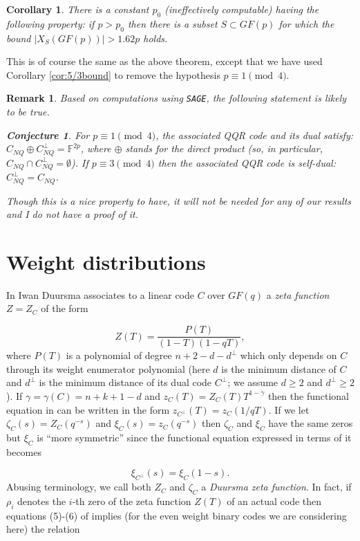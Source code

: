 \documentclass[submission%
]{dmtcs}
\newtheorem{remark}{Remark}
\newtheorem{conjecture}{Conjecture}
\newtheorem{corollary}{Corollary}
\def\fff{{\mathbb{F}}}
\def\sage{{\tt{SAGE}}}
\begin{document}
\begin{corollary}
\label{cor:main}
There is a constant $p_0$ (ineffectively computable) having the following
property: if $p>p_0$ then there is a 
subset $S\subset GF(p)$ for which the bound $|X_S(GF(p))| > 1.62p$
holds.
\end{corollary}

This is of course the same as the above theorem, except that
we have used Corollary \ref{cor:5/3bound} to remove
the hypothesis $p\equiv 1\pmod 4$.

\begin{remark}
Based on computations using \sage, the following statement is likely
to be true.

\begin{conjecture} 
\label{lemma:self-orth}
For $p\equiv 1 \pmod{4}$, the associated QQR code and its dual satisfy:
$C_{NQ} \oplus C_{NQ}^\perp = \fff^{2p}$, where $\oplus$ stands for the 
direct product (so, in particular, $C_{NQ} \cap C_{NQ}^\perp = \emptyset$).
If $p\equiv 3 \pmod 4$ then the associated QQR code is self-dual:
$C_{NQ}^\perp = C_{NQ}$.
\end{conjecture}

Though this is a nice property to have, it will not be needed for
any of our results and I do not have a proof of it.
\end{remark}

\section{Weight distributions}
\label{sec:duursma}

In \cite{D1} Iwan Duursma associates to a linear code $C$ 
over $GF(q)$ a {\it zeta function} $Z=Z_C$ of the form

\[
Z(T)=\frac{P(T)}{(1-T)(1-qT)},
\] 
where $P(T)$ is a polynomial of degree $n+2-d-d^\perp$
which only depends on $C$ through its weight enumerator 
polynomial
(here $d$ is the minimum distance of $C$ and $d^\perp$ is
the minimum distance of its dual code $C^\perp$; we assume
$d\geq 2$ and $d^\perp\geq 2$).
If $\gamma=\gamma(C) = n+k+1-d$ and 
$z_C(T)=Z_C(T)T^{1-\gamma}$ then 
the functional equation in \cite{D1} can be written in the form
$z_{C^\perp}(T)=z_C(1/qT)$. If we let
$\zeta_C(s) = Z_C(q^{-s})$ and $\xi_C(s) = z_C(q^{-s})$
then $\zeta_C$ and $\xi_C$ have the same zeros but $\xi_C$ is
``more symmetric'' since the functional equation expressed in terms of it
becomes

\[
\xi_{C^\perp}(s)=\xi_{C}(1-s).
\]
Abusing terminology, we call both $Z_C$ and $\zeta_C$ a
{\it Duursma zeta function}.
In fact, if $\rho_i$ denotes the $i$-th zero of the zeta function
$Z(T)$ of an actual code then equations (5)-(6) of \cite{D2} implies 
(for the even weight binary codes we are considering here) the relation 
\end{document}
